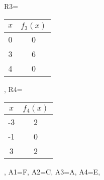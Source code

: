 \begin{beispiel}[FA 4.2]{1}
{				R3={\begin{tabular}{|c|c|}
			\hline
			$x$&$f_3(x)$\\
			\hline
			0&0\\
			\hline
			3&6\\
			\hline
			4&0\\
			\hline
			\end{tabular}},				%
				R4={\begin{tabular}{|c|c|}
			\hline
			$x$&$f_4(x)$\\
			\hline
			-3&2\\
			\hline
			-1&0\\
			\hline
			3&2\\
			\hline
			\end{tabular}},				%
				A1={F},				%
				A2={C},				%
				A3={A},				%
				A4={E},				%
				}
\end{beispiel}